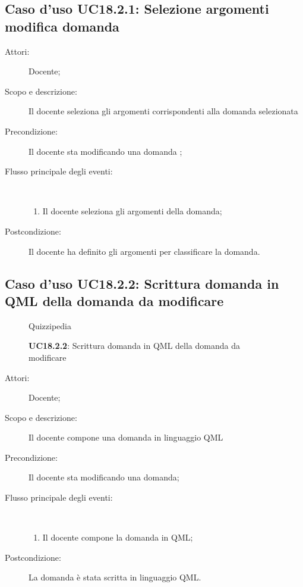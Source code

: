 \subsection{Caso d'uso UC18.2.1: Selezione argomenti modifica domanda}\begin{description}
\item[Attori:] Docente;
\item[Scopo e descrizione:] Il docente seleziona gli argomenti corrispondenti alla domanda selezionata
      \item[Precondizione:] Il docente sta modificando una domanda
;

        \item[Flusso principale degli eventi:] \ 
 \begin{enumerate}
          \item Il docente seleziona gli argomenti della domanda;

      \end{enumerate}
    \item[Postcondizione:] Il docente ha definito gli argomenti per classificare la domanda.
  \end{description}
\hypertarget{UC18.2.2}{}
\subsection{Caso d'uso UC18.2.2: Scrittura domanda in QML della domanda da modificare}
	\begin{figure}[H]
		\centering
		\begin{resizedtikzpicture}{\textwidth}
		\begin{umlsystem}[x=0, fill=lightgray!20]{Quizzipedia}
			\umlassoc{Docente}{164}
			\umlinherit{165}{164}
		\end{umlsystem}
		\end{resizedtikzpicture}
		\caption{\textbf{UC18.2.2}: Scrittura domanda in QML della domanda da modificare}
		\label{UC18.2.2}
	\end{figure}
\begin{description}
\item[Attori:] Docente;
\item[Scopo e descrizione:] Il docente compone una domanda in linguaggio QML
      \item[Precondizione:] Il docente sta modificando una domanda;

        \item[Flusso principale degli eventi:] \ 
 \begin{enumerate}
          \item Il docente compone la domanda in QML;

      \end{enumerate}
    \item[Postcondizione:] La domanda è stata scritta in linguaggio QML.
  \end{description}
\hypertarget{UC18.2.3}{}
